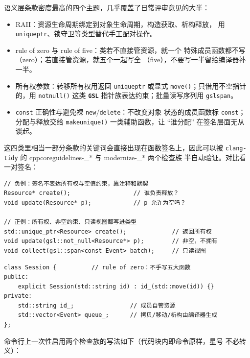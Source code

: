 \documentclass[12pt,a4paper,fontset=fandol]{ctexbook}
\newcommand{\Fn}[1]{\texttt{#1()}}
\newcommand{\Tp}[1]{\texttt{#1}}
\newcommand{\Bk}{\discretionary{}{}{}}
\newcommand{\Lib}[1]{\textbf{\texttt{#1}}}
\begin{document}
语义层条款密度最高的四个主题，几乎覆盖了日常评审意见的大半：

\begin{itemize}
\item RAII：资源生命周期绑定到对象生命周期，构造获取、析构释放，
  用 \Tp{unique{\Bk}ptr}、锁守卫等类型替代手工配对操作。
\item rule of zero 与 rule of five：类若不直接管资源，就一个
  特殊成员函数都不写（zero）；若直接管资源，就五个一起写全
  （five），不要写一半留给编译器补一半。
\item 所有权参数：转移所有权用返回 \Tp{unique{\Bk}ptr} 或显式
  \Fn{move}；只借用不空指针的，用 \Fn{not{\Bk}null} 这类
  \Lib{GSL} 指针族表达约束；批量读写序列用 \Tp{gsl{\Bk}span}。
\item \Tp{const} 正确性与避免裸 \Tp{new}/{\Bk}\Tp{delete}：不改变对象
  状态的成员函数标 \Tp{const}；分配与释放交给 \Fn{make{\Bk}unique}
  一类辅助函数，让 ``谁分配'' 在签名层面无从谈起。
\end{itemize}

这四类里相当一部分条款的关键词会直接出现在函数签名上，因此可以被
\Tp{clang-tidy} 的 cppcore\allowbreak guidelines-\allowbreak \_* 与 modernize-\_* 两个检查族
半自动验证。对比看一对签名：

\begin{lstlisting}[style=cppstyle,caption={所有权与约束由类型承载：上例靠注释约定，下例靠签名表达},label={lst:ch05-ownership}]
// 负例：签名不表达所有权与空值约束，靠注释和默契
Resource* create();                  // 谁负责释放？
void update(Resource* p);            // p 允许为空吗？

// 正例：所有权、非空约束、只读视图都写进类型
std::unique_ptr<Resource> create();             // 返回所有权
void update(gsl::not_null<Resource*> p);        // 非空，不拥有
void collect(gsl::span<const Event> batch);     // 只读视图
\end{lstlisting}

\begin{lstlisting}[style=cppstyle,caption={rule of zero 的实际形态：成员自治，类本体不写特殊成员函数},label={lst:ch05-zero}]
class Session {          // rule of zero：不手写五大函数
public:
    explicit Session(std::string id) : id_(std::move(id)) {}
private:
    std::string id_;                // 成员自管资源
    std::vector<Event> queue_;      // 拷贝/移动/析构由编译器生成
};
\end{lstlisting}

命令行上一次性启用两个检查族的写法如下（代码块内即命令原样，星号
不必转义）：
\end{document}
